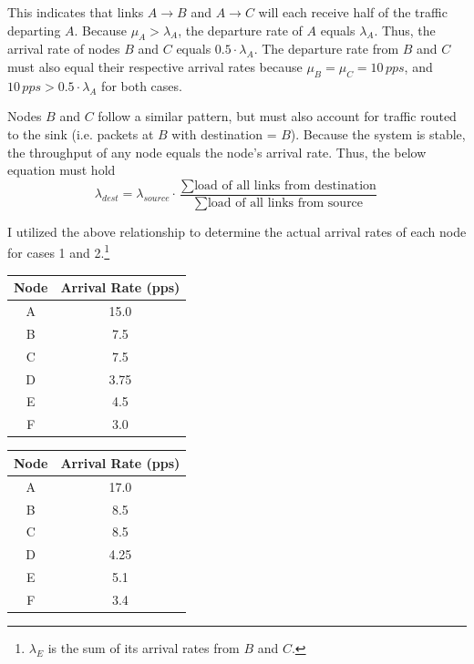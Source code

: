 \documentclass{article}
\begin{document}
This indicates that links $A \rightarrow B$ and $A \rightarrow C$ will each receive half of the traffic departing $A$.
Because $\mu_A > \lambda_A$, the departure rate of $A$ equals $\lambda_A$.
Thus, the arrival rate of nodes $B$ and $C$ equals $0.5 \cdot \lambda_A$.
The departure rate from $B$ and $C$ must also equal their respective arrival rates because $\mu_B = \mu_C = 10 \, pps$, and $10 \, pps > 0.5 \cdot \lambda_A$ for both cases.

Nodes $B$ and $C$ follow a similar pattern, but must also account for traffic routed to the sink (i.e. packets at $B$ with destination = $B$).
Because the system is stable, the throughput of any node equals the node's arrival rate.
Thus, the below equation must hold
\begin{equation}
\lambda_{dest} = \lambda_{source} \cdot \frac{\sum \text{load of all links from destination}}{\sum \text{load of all links from source}}
\label{eq:arrivalRates}
\end{equation}

I utilized the above relationship to determine the actual arrival rates of each node for cases 1 and 2.\footnote{$\lambda_E$ is the sum of its arrival rates from $B$ and $C$.}
\newline

\begin{minipage}{0.5\textwidth}
\centering
\begin{tabular}{|c|c|} \hline
\textbf{Node} & \textbf{Arrival Rate (pps)} \\ \hline
A & 15.0 \\ \hline
B & 7.5 \\ \hline
C & 7.5 \\ \hline
D & 3.75 \\ \hline
E & 4.5 \\ \hline
F & 3.0 \\ \hline
\end{tabular}
\label{tab:expArrival_case1}
\end{minipage}
\begin{minipage}{0.5\textwidth}
\centering
\begin{tabular}{|c|c|} \hline
\textbf{Node} & \textbf{Arrival Rate (pps)} \\ \hline
A & 17.0 \\ \hline
B & 8.5 \\ \hline
C & 8.5 \\ \hline
D & 4.25 \\ \hline
E & 5.1 \\ \hline
F & 3.4 \\ \hline
\end{tabular}
\label{tab:expArrival_case2}
\end{minipage}
\newline
\end{document}
